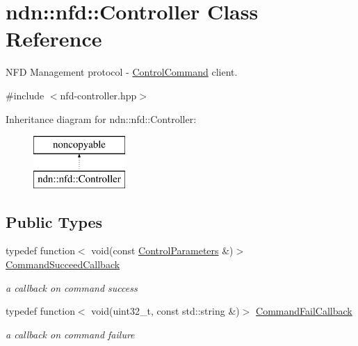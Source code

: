 \hypertarget{classndn_1_1nfd_1_1Controller}{}\section{ndn\+:\+:nfd\+:\+:Controller Class Reference}
\label{classndn_1_1nfd_1_1Controller}


N\+FD Management protocol -\/ \hyperlink{classndn_1_1nfd_1_1ControlCommand}{Control\+Command} client.  




{\ttfamily \#include $<$nfd-\/controller.\+hpp$>$}

Inheritance diagram for ndn\+:\+:nfd\+:\+:Controller\+:\begin{figure}[H]
\begin{center}
\leavevmode
\includegraphics[height=2.000000cm]{classndn_1_1nfd_1_1Controller}
\end{center}
\end{figure}
\subsection*{Public Types}
\begin{DoxyCompactItemize}
\item 
typedef function$<$ void(const \hyperlink{classndn_1_1nfd_1_1ControlParameters}{Control\+Parameters} \&)$>$ \hyperlink{classndn_1_1nfd_1_1Controller_a7dde1f6afdc8f2b58bc3dc6b4661a4f4}{Command\+Succeed\+Callback}\hypertarget{classndn_1_1nfd_1_1Controller_a7dde1f6afdc8f2b58bc3dc6b4661a4f4}{}\label{classndn_1_1nfd_1_1Controller_a7dde1f6afdc8f2b58bc3dc6b4661a4f4}

\begin{DoxyCompactList}\small\item\em a callback on command success \end{DoxyCompactList}\item 
typedef function$<$ void(uint32\+\_\+t, const std\+::string \&)$>$ \hyperlink{classndn_1_1nfd_1_1Controller_ad1a5fe51dfacb28c3fb624f03e9f50bb}{Command\+Fail\+Callback}\hypertarget{classndn_1_1nfd_1_1Controller_ad1a5fe51dfacb28c3fb624f03e9f50bb}{}\label{classndn_1_1nfd_1_1Controller_ad1a5fe51dfacb28c3fb624f03e9f50bb}

\begin{DoxyCompactList}\small\item\em a callback on command failure \end{DoxyCompactList}\end{DoxyCompactItemize}
